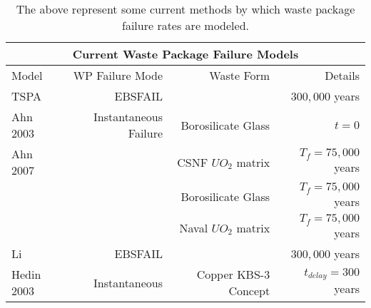 \begin{table}[h!]
\centering
\footnotesize{
\begin{tabular}[h!bt]{|l|r|r|r|}
  \multicolumn{4}{c}{\textbf{Current Waste Package Failure Models}}\\
  \hline
  Model&WP Failure Mode&Waste Form&Details\\
  \hline
  TSPA&EBSFAIL&&$300,000$ years\\
  \hline
  Ahn 2003&Instantaneous Failure&Borosilicate Glass&$t=0$\\
  \hline
  Ahn 2007& &CSNF $UO_2$ matrix &$T_f=75,000$ years\\
  & &Borosilicate Glass &$T_f=75,000$ years\\
  & & Naval $UO_2$ matrix &$T_f=75,000$ years\\
  \hline
  Li&EBSFAIL&&$300,000$ years\\
  \hline
  Hedin 2003& Instantaneous & Copper KBS-3 Concept & $t_{delay} = 300$ years \\
  \hline
\end{tabular}
\label{tab:wpfail}
\caption[Current WP Failure Models]{The above represent some current methods by which 
waste package failure rates are modeled.}
}
\end{table}
